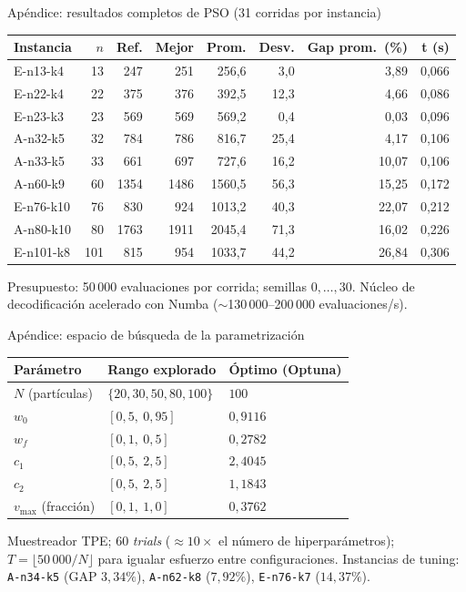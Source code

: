 \documentclass[aspectratio=169, 11pt, xcolor={dvipsnames,table}]{beamer}
\begin{document}
\begin{frame}[noframenumbering]{Apéndice: resultados completos de PSO (31 corridas por instancia)}
\centering
\footnotesize
\setlength{\tabcolsep}{6pt}
\begin{tabular}{@{}lrrrrrrr@{}}
\toprule
\textbf{Instancia} & $n$ & \textbf{Ref.} & \textbf{Mejor} & \textbf{Prom.} & \textbf{Desv.} & \textbf{Gap prom.\ (\%)} & \textbf{t (s)} \\
\midrule
E-n13-k4  & 13  & 247  & 251  & 256{,}6  & 3{,}0  & 3{,}89  & 0{,}066 \\
E-n22-k4  & 22  & 375  & 376  & 392{,}5  & 12{,}3 & 4{,}66  & 0{,}086 \\
E-n23-k3  & 23  & 569  & 569  & 569{,}2  & 0{,}4  & 0{,}03  & 0{,}096 \\
A-n32-k5  & 32  & 784  & 786  & 816{,}7  & 25{,}4 & 4{,}17  & 0{,}106 \\
A-n33-k5  & 33  & 661  & 697  & 727{,}6  & 16{,}2 & 10{,}07 & 0{,}106 \\
\midrule
A-n60-k9   & 60  & 1354 & 1486 & 1560{,}5 & 56{,}3 & 15{,}25 & 0{,}172 \\
E-n76-k10  & 76  & 830  & 924  & 1013{,}2 & 40{,}3 & 22{,}07 & 0{,}212 \\
A-n80-k10  & 80  & 1763 & 1911 & 2045{,}4 & 71{,}3 & 16{,}02 & 0{,}226 \\
E-n101-k8  & 101 & 815  & 954  & 1033{,}7 & 44{,}2 & 26{,}84 & 0{,}306 \\
\bottomrule
\end{tabular}
\vspace{4pt}

{\scriptsize Presupuesto: 50\,000 evaluaciones por corrida; semillas $0,\ldots,30$. Núcleo de decodificación acelerado con Numba ($\sim$130\,000--200\,000 evaluaciones/s).}
\end{frame}

\begin{frame}[noframenumbering]{Apéndice: espacio de búsqueda de la parametrización}
\centering
\footnotesize
\setlength{\tabcolsep}{8pt}
\begin{tabular}{@{}lll@{}}
\toprule
\textbf{Parámetro} & \textbf{Rango explorado} & \textbf{Óptimo (Optuna)} \\
\midrule
$N$ (partículas) & $\{20, 30, 50, 80, 100\}$ & $100$ \\
$w_0$ & $[0{,}5,\ 0{,}95]$ & $0{,}9116$ \\
$w_f$ & $[0{,}1,\ 0{,}5]$ & $0{,}2782$ \\
$c_1$ & $[0{,}5,\ 2{,}5]$ & $2{,}4045$ \\
$c_2$ & $[0{,}5,\ 2{,}5]$ & $1{,}1843$ \\
$v_{\max}$ (fracción) & $[0{,}1,\ 1{,}0]$ & $0{,}3762$ \\
\bottomrule
\end{tabular}
\vspace{4pt}

{\scriptsize Muestreador TPE; 60 \textit{trials} ($\approx 10\times$ el número de hiperparámetros); $T=\lfloor 50\,000/N \rfloor$ para igualar esfuerzo entre configuraciones. Instancias de tuning: \texttt{A-n34-k5} (GAP $3{,}34\%$), \texttt{A-n62-k8} ($7{,}92\%$), \texttt{E-n76-k7} ($14{,}37\%$).}
\end{frame}
\end{document}

